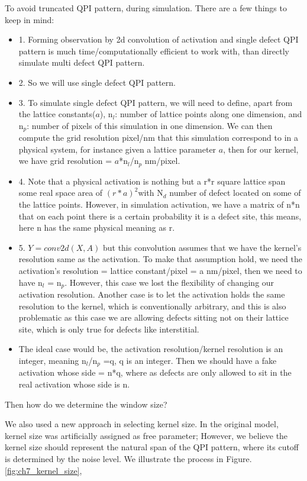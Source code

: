 To avoid truncated QPI pattern, during simulation. There are a few things to keep in mind: 
\begin{itemize}
	\item 1. Forming observation by 2d convolution of activation and single defect QPI pattern is much time/computationally efficient to work with, than directly simulate multi defect QPI pattern. 
	\item 2. So we will use single defect QPI pattern. 
	\item 3. To simulate single defect QPI pattern, we will need to define, apart from the lattice constants($a$), n$_l$: number of lattice points along one dimension, and n$_p$: number of pixels of this simulation in one dimension. We can then compute the grid resolution pixel/nm that this simulation correspond to in a physical system, for instance given a lattice parameter $a$, then for our kernel, we have grid resolution = $a$*n$_l$/n$_p$ nm/pixel.
	\item 4. Note that a physical activation is nothing but a r*r square lattice span some real space area of $(r*a)^2$with N$_d$ number of defect located on some of the lattice points. However, in simulation activation, we have a matrix of n*n that on each point there is a certain probability it is a defect site, this means, here n has the same physical meaning as r.
	\item 5. $Y=conv2d(X,A)$ but this convolution assumes that we have the kernel's resolution same as the activation. To make that assumption hold, we need the activation's resolution = lattice constant/pixel = a nm/pixel, then we need to have n$_l$ = n$_p$. However, this case we lost the flexibility of changing our activation resolution. Another case is to let the activation holds the same resolution to the kernel, which is conventionally arbitrary, and this is also problematic as this case we are allowing defects sitting not on their lattice site, which is only true for defects like interstitial.
	\item The ideal case would be, the  activation resolution/kernel resolution is an integer, meaning n$_l$/n$_p$ =q, q is an integer. Then we should have a fake activation whose side = n*q, where as defects are only allowed to sit in the real activation whose side is n.
\end{itemize}
Then how do we determine the window size?  

We also used a new approach in selecting kernel size. In the original model, kernel size was artificially assigned as free parameter; However, we believe the kernel size should represent the natural span of the QPI pattern, where its cutoff is determined by the noise level. We illustrate the process in Figure. \ref{fig:ch7_kernel_size}, 


